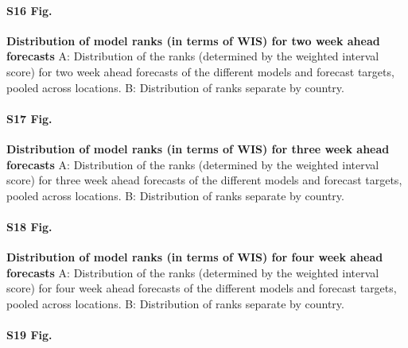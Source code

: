 \documentclass[10pt,letterpaper]{article}
\begin{document}
\paragraph{S16 Fig.}
\label{A: Distribution of the ranks (determined by the weighted interval score) for two week ahead forecasts of the different models and forecast targets, pooled across locations. B: Distribution of ranks separate by country.}

\textbf{Distribution of model ranks (in terms of WIS) for two week ahead forecasts}
A: Distribution of the ranks (determined by the weighted interval score)
for two week ahead forecasts of the different models and forecast
targets, pooled across locations. B: Distribution of ranks separate by
country.

\paragraph{S17 Fig.}
\label{A: Distribution of the ranks (determined by the weighted interval score) for three week ahead forecasts of the different models and forecast targets, pooled across locations. B: Distribution of ranks separate by country.}

\textbf{Distribution of model ranks (in terms of WIS) for three week ahead forecasts}
A: Distribution of the ranks (determined by the weighted interval score)
for three week ahead forecasts of the different models and forecast
targets, pooled across locations. B: Distribution of ranks separate by
country.

\paragraph{S18 Fig.}
\label{A: Distribution of the ranks (determined by the weighted interval score) for four week ahead forecasts of the different models and forecast targets, pooled across locations. B: Distribution of ranks separate by country.}

\textbf{Distribution of model ranks (in terms of WIS) for four week ahead forecasts}
A: Distribution of the ranks (determined by the weighted interval score)
for four week ahead forecasts of the different models and forecast
targets, pooled across locations. B: Distribution of ranks separate by
country.

\paragraph{S19 Fig.}
\label{fig:distribution-scores-differences}
\end{document}
